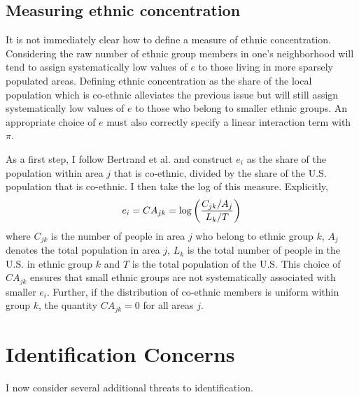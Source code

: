 \documentclass[11pt, oneside]{article}   	%
\newcommand{\eq}[1]{\begin{align}#1\end{align}}
\begin{document}
\subsection{Measuring ethnic concentration}

It is not immediately clear how to define a measure of ethnic concentration. Considering the raw number of ethnic group members in one's neighborhood will tend to assign systematically low values of $e$ to those living in more sparsely populated areas. Defining ethnic concentration as the share of the local population which is co-ethnic alleviates the previous issue but will still assign systematically low values of $e$ to those who belong to smaller ethnic groups. An appropriate choice of $e$ must also correctly specify a linear interaction term with $\pi$.

As a first step, I follow Bertrand et al. and construct $e_{i}$ as the share of the population within area $j$ that is co-ethnic, divided by the share of the U.S. population that is co-ethnic. I then take the log of this measure. Explicitly,
\eq{
	e_i = CA_{jk} = \log \qty(\frac{C_{jk}/A_j}{L_k/T}) \label{e:ethnicity}
}
where $C_{jk}$ is the number of people in area $j$ who belong to ethnic group $k$, $A_j$ denotes the total population in area $j$, $L_k$ is the total number of people in the U.S. in ethnic group $k$ and $T$ is the total population of the U.S. This choice of $CA_{jk}$ ensures that small ethnic groups are not systematically associated with smaller $e_i$. Further, if the distribution of co-ethnic members is uniform within group $k$, the quantity $CA_{jk}=0$ for all areas $j$.

\section{Identification Concerns}

I now consider several additional threats to identification. 
\end{document}
